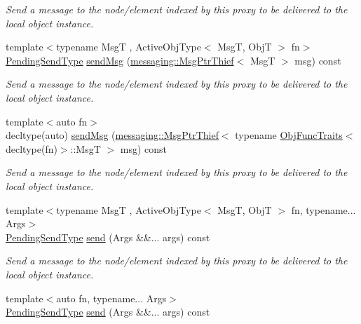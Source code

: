 \begin{DoxyCompactItemize}
\begin{DoxyCompactList}\small\item\em Send a message to the node/element indexed by this proxy to be delivered to the local object instance. \end{DoxyCompactList}\item 
{\footnotesize template$<$typename MsgT , Active\+Obj\+Type$<$ Msg\+T, Obj\+T $>$ fn$>$ }\\\hyperlink{structvt_1_1objgroup_1_1proxy_1_1_proxy_elm_ab0f40d6a0191c974a4f4dd9dec0fc02f}{Pending\+Send\+Type} \hyperlink{structvt_1_1objgroup_1_1proxy_1_1_proxy_elm_ad08b5f3df7ea73d8fd11b30225c8f971}{send\+Msg} (\hyperlink{structvt_1_1messaging_1_1_msg_ptr_thief}{messaging\+::\+Msg\+Ptr\+Thief}$<$ MsgT $>$ msg) const
\begin{DoxyCompactList}\small\item\em Send a message to the node/element indexed by this proxy to be delivered to the local object instance. \end{DoxyCompactList}\item 
{\footnotesize template$<$auto fn$>$ }\\decltype(auto) \hyperlink{structvt_1_1objgroup_1_1proxy_1_1_proxy_elm_a26b48c8196ad767de25c48048eab65cd}{send\+Msg} (\hyperlink{structvt_1_1messaging_1_1_msg_ptr_thief}{messaging\+::\+Msg\+Ptr\+Thief}$<$ typename \hyperlink{structvt_1_1_obj_func_traits}{Obj\+Func\+Traits}$<$ decltype(fn)$>$\+::MsgT $>$ msg) const
\begin{DoxyCompactList}\small\item\em Send a message to the node/element indexed by this proxy to be delivered to the local object instance. \end{DoxyCompactList}\item 
{\footnotesize template$<$typename MsgT , Active\+Obj\+Type$<$ Msg\+T, Obj\+T $>$ fn, typename... Args$>$ }\\\hyperlink{structvt_1_1objgroup_1_1proxy_1_1_proxy_elm_ab0f40d6a0191c974a4f4dd9dec0fc02f}{Pending\+Send\+Type} \hyperlink{structvt_1_1objgroup_1_1proxy_1_1_proxy_elm_a00370ac0c4f3cf81b10685ea4963484d}{send} (Args \&\&... args) const
\begin{DoxyCompactList}\small\item\em Send a message to the node/element indexed by this proxy to be delivered to the local object instance. \end{DoxyCompactList}\item 
{\footnotesize template$<$auto fn, typename... Args$>$ }\\\hyperlink{structvt_1_1objgroup_1_1proxy_1_1_proxy_elm_ab0f40d6a0191c974a4f4dd9dec0fc02f}{Pending\+Send\+Type} \hyperlink{structvt_1_1objgroup_1_1proxy_1_1_proxy_elm_a57aa5388399d4e2c186772fc050a3f90}{send} (Args \&\&... args) const

\end{DoxyCompactItemize}
